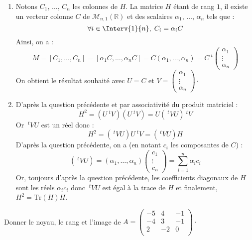 \documentclass[a4paper,10pt]{report}
\begin{document}
\begin{enumerate}
\item Notons $C_1$, $\ldots$, $C_n$ les colonnes de $H$. La matrice $H$ étant de rang $1$, il existe un vecteur colonne $C$ de $\mathcal{M}_{n,1}(\mathbb{R})$ et des scalaires $\alpha_1$, $\ldots$, $\alpha_n$ tels que :
$$ \forall i \in \Interv{1}{n}, \; C_i =\alpha_i C $$
Ainsi, on a :
$$ M = [C_1, \ldots, C_n] = [\alpha_1 C, \ldots, \alpha_n C] = C (\alpha_1, \ldots, \alpha_n) = C~^t \begin{pmatrix}
\alpha_1 \\
\vdots \\
\alpha_n
\end{pmatrix}$$
On obtient le résultat souhaité avec $U=C$ et $V = \begin{pmatrix}
\alpha_1 \\
\vdots \\
\alpha_n
\end{pmatrix} \cdot$
\item D'après la question précédente et par associativité du produit matriciel :
$$ H^2 = (U ~^tV) (U ~^tV) = U( ~^tVU )~^tV$$
Or $~^tVU$ est un réel donc :
$$ H^2 = (~^tVU ) U ~^tV =  (~^tVU ) H$$
D'après la question précédente, on a (en notant $c_i$ les composantes de $C$) :
$$ (~^tVU ) = (\alpha_1, \ldots, \alpha_n) \begin{pmatrix}
c_1 \\
\vdots \\
c_n
\end{pmatrix} = \sum_{i=1}^n \alpha_i c_i $$
Or, toujours d'après la question précédente, les coefficients diagonaux de $H$ sont les réels $\alpha_i c_i$ donc $~^tVU $ est égal à la trace de $H$ et finalement, $H^2 = \textrm{Tr}(H)H$.
\end{enumerate}

\begin{Exa} Donner le noyau, le rang et l'image de $A = \begin{pmatrix}
-5 & 4 & -1 \\
-4 & 3 & - 1 \\
2 	 & -2 & 0 \\
\end{pmatrix}\cdot$
\end{Exa}
\end{document}
